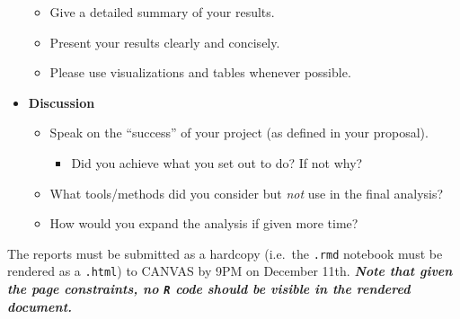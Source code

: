 \documentclass[
  12pt,
]{article}
\providecommand{\tightlist}{%
  \setlength{\itemsep}{0pt}\setlength{\parskip}{0pt}}
\begin{document}
\begin{itemize}
  \begin{itemize}
  \item
    Give a detailed summary of your results.
  \item
    Present your results clearly and concisely.
  \item
    Please use visualizations and tables whenever possible.
  \end{itemize}
\item
  \textbf{Discussion}

  \begin{itemize}
  \item
    Speak on the ``success'' of your project (as defined in your
    proposal).

    \begin{itemize}
    \tightlist
    \item
      Did you achieve what you set out to do? If not why?
    \end{itemize}
  \item
    What tools/methods did you consider but \emph{not} use in the final
    analysis?
  \item
    How would you expand the analysis if given more time?
  \end{itemize}
\end{itemize}

The reports must be submitted as a hardcopy (i.e.~the \texttt{.rmd}
notebook must be rendered as a \texttt{.html}) to CANVAS by 9PM on
December 11th. \textbf{\emph{Note that given the page constraints, no
\texttt{R} code should be visible in the rendered document.}}
\end{document}
